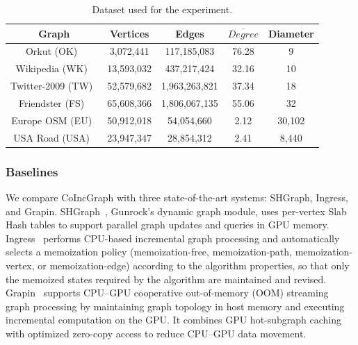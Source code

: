 \begin{table}[!htbp]
\centering
\caption{Dataset used for the experiment.}
\label{tab:datasets}
\footnotesize 
\setlength{\tabcolsep}{3pt}
\begin{tabular}{c|c|c|c|c}
\hline
Graph & Vertices & Edges & $\overline{Degree}$ & Diameter \\
\hline
Orkut (OK)\ \cite{OKFS} & 3,072,441 & 117,185,083 & 76.28 & 9 \\
Wikipedia (WK)\ \cite{WK} & 13,593,032 & 437,217,424 & 32.16 & 10  \\
Twitter-2009 (TW)\ \cite{TW} & 52,579,682 & 1,963,263,821 & 37.34 & 18 \\
Friendster (FS)\ \cite{OKFS} & 65,608,366 & 1,806,067,135 & 55.06  & 32 \\
Europe OSM (EU)\ \cite{eu} & 50,912,018 & 54,054,660 & 2.12  & 30,102 \\
USA Road (USA)\ \cite{usa} & 23,947,347 & 28,854,312 & 2.41 & 8,440 \\
\hline
\end{tabular}
\end{table}

\subsubsection{Baselines} We compare CoIncGraph with three state-of-the-art systems: SHGraph, Ingress, and Grapin. SHGraph~\cite{2020-SHGraph}, Gunrock's dynamic graph module, uses per-vertex Slab Hash tables to support parallel graph updates and queries in GPU memory. Ingress~\cite{2021-Ingress} performs CPU-based incremental graph processing and automatically selects a memoization policy (memoization-free, memoization-path, memoization-vertex, or memoization-edge) according to the algorithm properties, so that only the memoized states required by the algorithm are maintained and revised. Grapin~\cite{2025-Grapin} supports CPU--GPU cooperative out-of-memory (OOM) streaming graph processing by maintaining graph topology in host memory and executing incremental computation on the GPU. It combines GPU hot-subgraph caching with optimized zero-copy access to reduce CPU--GPU data movement.
